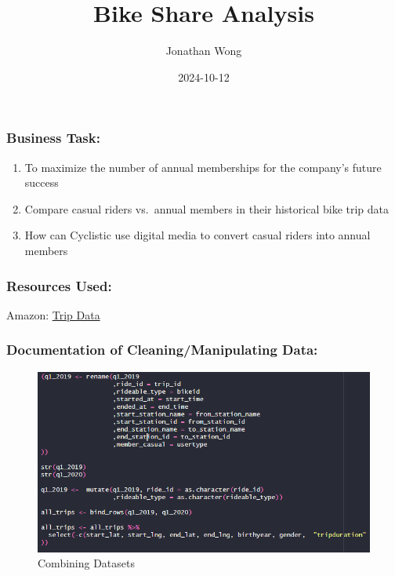 \documentclass[
]{article}
\title{Bike Share Analysis}
\author{Jonathan Wong}
\date{2024-10-12}
\providecommand{\tightlist}{%
  \setlength{\itemsep}{0pt}\setlength{\parskip}{0pt}}
\begin{document}
\maketitle

\subsubsection{Business Task:}\label{business-task}

\begin{enumerate}
\def\labelenumi{\arabic{enumi})}
\tightlist
\item
  To maximize the number of annual memberships for the company's future
  success
\item
  Compare casual riders vs.~annual members in their historical bike trip
  data
\item
  How can Cyclistic use digital media to convert casual riders into
  annual members
\end{enumerate}

\subsubsection{Resources Used:}\label{resources-used}

Amazon: \href{https://divvy-tripdata.s3.amazonaws.com/index.html}{Trip
Data}

\subsubsection{Documentation of Cleaning/Manipulating
Data:}\label{documentation-of-cleaningmanipulating-data}

\begin{figure}
\centering
\includegraphics{Code_Image_1.png}
\caption{Combining Datasets}
\end{figure}
\end{document}
